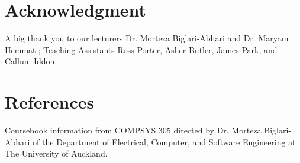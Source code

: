 \documentclass[conference]{IEEEtran}
\begin{document}
\section*{Acknowledgment}

A big thank you to our lecturers Dr. Morteza Biglari-Abhari and Dr. Maryam Hemmati; Teaching Assistants Ross Porter, Asher Butler, James Park, and Callum Iddon.

\section*{References}

Coursebook information from COMPSYS 305 directed by Dr. Morteza Biglari-Abhari of the Department of Electrical, Computer, and Software Engineering at The University of Auckland.

\nocite{*}


\end{document}
